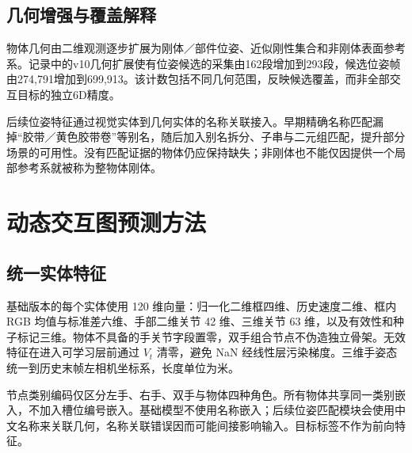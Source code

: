 \subsection{几何增强与覆盖解释}
物体几何由二维观测逐步扩展为刚体／部件位姿、近似刚性集合和非刚体表面参考系。记录中的v10几何扩展使有位姿候选的采集由162段增加到293段，候选位姿帧由274,791增加到699,913。该计数包括不同几何范围，反映候选覆盖，而非全部交互目标的独立6D精度。

后续位姿特征通过视觉实体到几何实体的名称关联接入。早期精确名称匹配漏掉“胶带／黄色胶带卷”等别名，随后加入别名拆分、子串与二元组匹配，提升部分场景的可用性。没有匹配证据的物体仍应保持缺失；非刚体也不能仅因提供一个局部参考系就被称为整物体刚体。
\section{动态交互图预测方法}
\subsection{统一实体特征}
基础版本的每个实体使用 120 维向量：归一化二维框四维、历史速度二维、框内 RGB 均值与标准差六维、手部二维关节 42 维、三维关节 63 维，以及有效性和种子标记三维。物体不具备的手关节字段置零，双手组合节点不伪造独立骨架。无效特征在进入可学习层前通过 $V_t$ 清零，避免 NaN 经线性层污染梯度。三维手姿态统一到历史末帧左相机坐标系，长度单位为米。

节点类别编码仅区分左手、右手、双手与物体四种角色。所有物体共享同一类别嵌入，不加入槽位编号嵌入。基础模型不使用名称嵌入；后续位姿匹配模块会使用中文名称来关联几何，名称关联错误因而可能间接影响输入。目标标签不作为前向特征。

